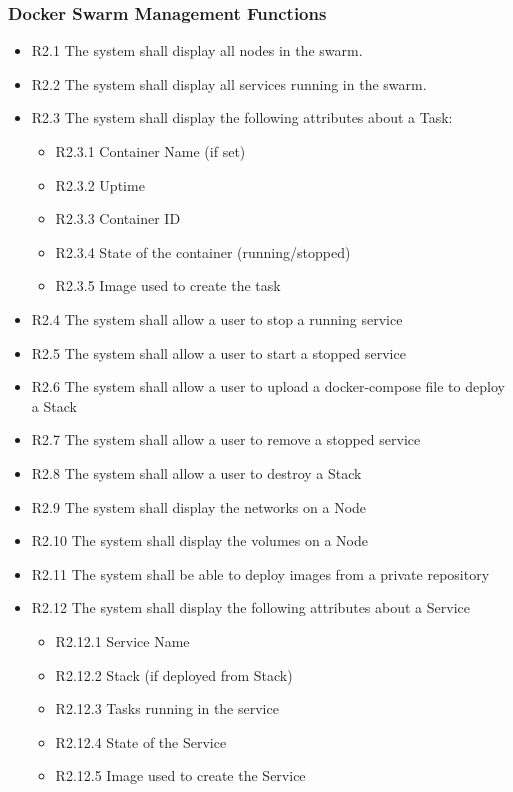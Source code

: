 \documentclass[]{article}
\begin{document}
\subsubsection{Docker Swarm Management Functions}
\begin{itemize}
	\item R2.1 The system shall display all nodes in the swarm.
	\item R2.2 The system shall display all services running in the swarm.
	\item R2.3 The system shall display the following attributes about a Task:
	      \begin{itemize}
		      \item R2.3.1 Container Name (if set)
		      \item R2.3.2 Uptime
		      \item R2.3.3 Container ID
		      \item R2.3.4 State of the container (running/stopped)
		      \item R2.3.5 Image used to create the task
	      \end{itemize}
	\item R2.4 The system shall allow a user to stop a running service
	\item R2.5 The system shall allow a user to start a stopped service
	\item R2.6 The system shall allow a user to upload a docker-compose file to deploy a Stack
	\item R2.7 The system shall allow a user to remove a stopped service
	\item R2.8 The system shall allow a user to destroy a Stack
	\item R2.9 The system shall display the networks on a Node
	\item R2.10 The system shall display the volumes on a Node
	\item R2.11 The system shall be able to deploy images from a private repository
	\item R2.12 The system shall display the following attributes about a Service
	      \begin{itemize}
		      \item R2.12.1 Service Name
		      \item R2.12.2 Stack (if deployed from Stack)
		      \item R2.12.3 Tasks running in the service
		      \item R2.12.4 State of the Service
		      \item R2.12.5 Image used to create the Service
	      \end{itemize}
\end{itemize}
\end{document}
